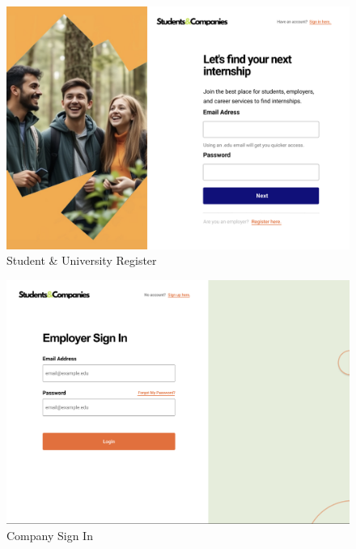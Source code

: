 \documentclass{article}
\begin{document}
\begin{figure}[H]
    \centering
    \includegraphics[scale = 0.40]{figures/UserInterfaces/StudentRegister.png}
    \caption{Student \& University Register}
     \centering
\end{figure}

\begin{figure}[H]
    \centering
    \includegraphics[scale = 0.40]{figures/UserInterfaces/Employer Sign In.png}
    \caption{Company Sign In}
     \centering
\end{figure}
\end{document}
